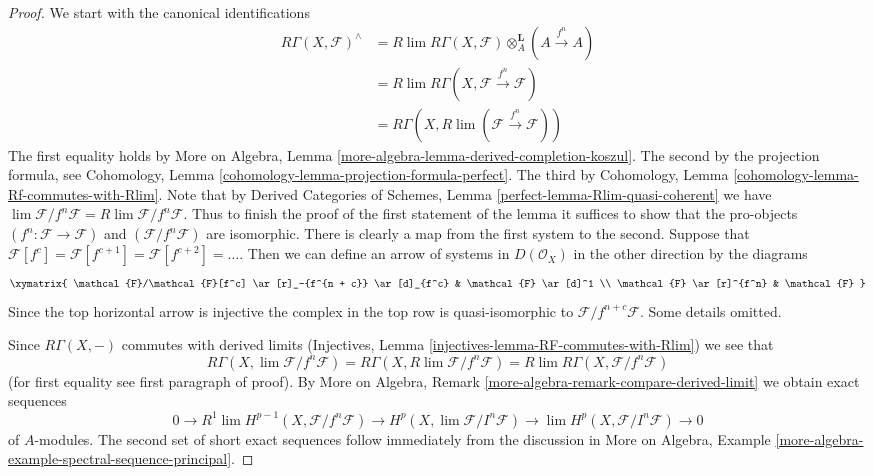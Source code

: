 \begin{proof}
We start with the canonical identifications
\begin{align*}
R\Gamma(X, \mathcal{F})^\wedge
& =
R\lim R\Gamma(X, \mathcal{F}) \otimes_A^\mathbf{L} (A \xrightarrow{f^n} A) \\
& =
R\lim R\Gamma(X, \mathcal{F} \xrightarrow{f^n} \mathcal{F}) \\
& =
R\Gamma(X, R\lim (\mathcal{F} \xrightarrow{f^n} \mathcal{F}))
\end{align*}
The first equality holds by
More on Algebra, Lemma \ref{more-algebra-lemma-derived-completion-koszul}.
The second by the projection formula, see 
Cohomology, Lemma \ref{cohomology-lemma-projection-formula-perfect}.
The third by Cohomology, Lemma
\ref{cohomology-lemma-Rf-commutes-with-Rlim}.
Note that by Derived Categories of Schemes, Lemma
\ref{perfect-lemma-Rlim-quasi-coherent} we have
$\lim \mathcal{F}/f^n\mathcal{F} = R\lim \mathcal{F}/f^n \mathcal{F}$.
Thus to finish the proof of the first statement of the lemma it suffices to
show that the pro-objects $(f^n : \mathcal{F} \to \mathcal{F})$
and $(\mathcal{F}/f^n \mathcal{F})$ are isomorphic. There is clearly
a map from the first system to the second. Suppose that
$\mathcal{F}[f^c] = \mathcal{F}[f^{c + 1}] = \mathcal{F}[f^{c + 2}] = \ldots$.
Then we can define an arrow of systems in $D(\mathcal{O}_X)$
in the other direction by the diagrams
$$
\xymatrix{
\mathcal{F}/\mathcal{F}[f^c] \ar[r]_-{f^{n + c}} \ar[d]_{f^c} &
\mathcal{F} \ar[d]^1 \\
\mathcal{F} \ar[r]^{f^n} & \mathcal{F}
}
$$
Since the top horizontal arrow is injective the complex
in the top row is quasi-isomorphic to $\mathcal{F}/f^{n + c}\mathcal{F}$.
Some details omitted.

\medskip\noindent
Since $R\Gamma(X, -)$ commutes with derived limits
(Injectives, Lemma \ref{injectives-lemma-RF-commutes-with-Rlim})
we see that
$$
R\Gamma(X, \lim \mathcal{F}/f^n\mathcal{F}) =
R\Gamma(X, R\lim \mathcal{F}/f^n\mathcal{F}) =
R\lim R\Gamma(X, \mathcal{F}/f^n\mathcal{F})
$$
(for first equality see first paragraph of proof).
By More on Algebra, Remark \ref{more-algebra-remark-compare-derived-limit}
we obtain exact sequences
$$
0 \to
R^1\lim H^{p - 1}(X, \mathcal{F}/f^n\mathcal{F}) \to
H^p(X, \lim \mathcal{F}/I^n\mathcal{F}) \to
\lim H^p(X, \mathcal{F}/I^n\mathcal{F}) \to 0
$$
of $A$-modules. The second set of short exact sequences follow immediately
from the discussion in More on Algebra, Example
\ref{more-algebra-example-spectral-sequence-principal}.
\end{proof}

